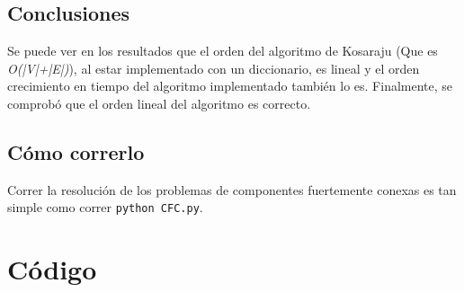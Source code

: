 \documentclass[a4paper,10pt]{article}
\begin{document}
\subsection{Conclusiones}
	Se puede ver en los resultados que el orden del algoritmo de Kosaraju (Que es \emph{O(|V|+|E|)}), al estar implementado con un diccionario, es lineal y el orden crecimiento en tiempo del algoritmo implementado también lo es. Finalmente, se comprobó que el orden lineal del algoritmo es correcto.
\subsection{Cómo correrlo}
	Correr la resolución de los problemas de componentes fuertemente conexas es tan simple como correr \texttt{python CFC.py}.

\pagebreak

\newpage
\section{Código}
\lstset{
	language=Python, columns=flexible, breaklines=true, frame=single, title=asignacion\_de\_residencias.py
}


\lstset{ title=CFC.py }


\lstset{ title=correr\_asignacion.py }


\lstset{ title=dfs.py }


\lstset{ title=dfs\_iterativo.py }


\lstset{ title=grafo.py }


\lstset{ title=parser.py }


\lstset{ title=puntos\_articulacion.py }


\lstset{ title=resultado\_DFS.py }


\lstset{ title=tiempo.py }

\end{document}
